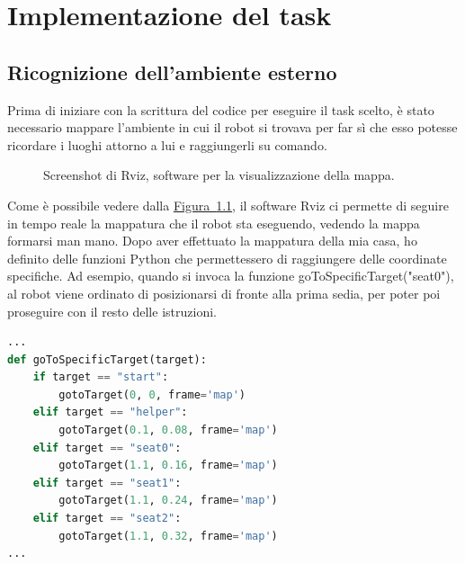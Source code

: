 \documentclass[italian, twoside]{sapthesis} %
\begin{document}
\chapter{Implementazione del task}
\label{chap:4}
\section{Ricognizione dell'ambiente esterno}
Prima di iniziare con la scrittura del codice per eseguire il task scelto, è stato necessario mappare l'ambiente in cui il robot si trovava per far sì che esso potesse ricordare i luoghi attorno a lui e raggiungerli su comando.

\begin{figure}[H]
    \centering
    \caption{Screenshot di Rviz, software per la visualizzazione della mappa.}
    \label{fig:rviz}
\end{figure}

Come è possibile vedere dalla \hyperref[fig:rviz]{Figura~\ref*{fig:rviz}}, il software Rviz ci permette di seguire in tempo reale la mappatura che il robot sta eseguendo, vedendo la mappa formarsi man mano. Dopo aver effettuato la mappatura della mia casa, ho definito delle funzioni Python che permettessero di raggiungere delle coordinate specifiche. Ad esempio, quando si invoca la funzione goToSpecificTarget("seat0"), al robot viene ordinato di posizionarsi di fronte alla prima sedia, per poter poi proseguire con il resto delle istruzioni.

\begin{lstlisting}[language=Python]
...
def goToSpecificTarget(target):
    if target == "start":
        gotoTarget(0, 0, frame='map')
    elif target == "helper":
        gotoTarget(0.1, 0.08, frame='map')
    elif target == "seat0":
        gotoTarget(1.1, 0.16, frame='map')
    elif target == "seat1":
        gotoTarget(1.1, 0.24, frame='map')
    elif target == "seat2":
        gotoTarget(1.1, 0.32, frame='map')
...
\end{lstlisting}
\end{document}
